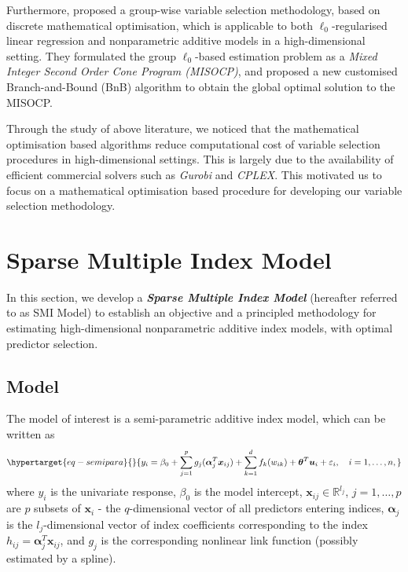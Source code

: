 \documentclass[11pt,a4paper,]{article}
\begin{document}
Furthermore, \textcite{Hazimeh2023} proposed a group-wise variable
selection methodology, based on discrete mathematical optimisation,
which is applicable to both \(\ell_{0}\)-regularised linear regression
and nonparametric additive models in a high-dimensional setting. They
formulated the group \(\ell_{0}\)-based estimation problem as a
\emph{Mixed Integer Second Order Cone Program (MISOCP)}, and proposed a
new customised Branch-and-Bound (BnB) algorithm
\autocite{Land1960,Little1963} to obtain the global optimal solution to
the MISOCP.

Through the study of above literature, we noticed that the mathematical
optimisation based algorithms reduce computational cost of variable
selection procedures in high-dimensional settings. This is largely due
to the availability of efficient commercial solvers such as
\emph{Gurobi} and \emph{CPLEX}. This motivated us to focus on a
mathematical optimisation based procedure for developing our variable
selection methodology.

\hypertarget{sec-SMI}{%
\section{Sparse Multiple Index Model}\label{sec-SMI}}

In this section, we develop a \textbf{\emph{Sparse Multiple Index
Model}} (hereafter referred to as SMI Model) to establish an objective
and a principled methodology for estimating high-dimensional
nonparametric additive index models, with optimal predictor selection.

\hypertarget{sec-model}{%
\subsection{Model}\label{sec-model}}

The model of interest is a semi-parametric additive index model, which
can be written as \begin{equation}\protect\hypertarget{eq-semipara}{}{
  y_{i} = \beta_{0} + \sum_{j = 1}^{p}g_{j}(\bm{\alpha}_{j}^{T}\bm{x}_{ij}) + \sum_{k = 1}^{d}f_{k}(w_{ik}) + \bm{\theta}^{T}\bm{u}_{i} + \varepsilon_{i}, \quad i = 1, \dots, n,
}\label{eq-semipara}\end{equation} where \(y_{i}\) is the univariate
response, \(\beta_{0}\) is the model intercept,
\(\bm{x}_{ij} \in \mathbb{R}^{l_{j}}\), \(j = 1, \dots, p\) are \(p\)
subsets of \(\bm{x}_{i}\) - the \(q\)-dimensional vector of all
predictors entering indices, \(\bm{\alpha}_{j}\) is the
\(l_{j}\)-dimensional vector of index coefficients corresponding to the
index \(h_{ij} = \bm{\alpha}_{j}^{T}\bm{x}_{ij}\), and \(g_{j}\) is the
corresponding nonlinear link function (possibly estimated by a spline).
\end{document}
